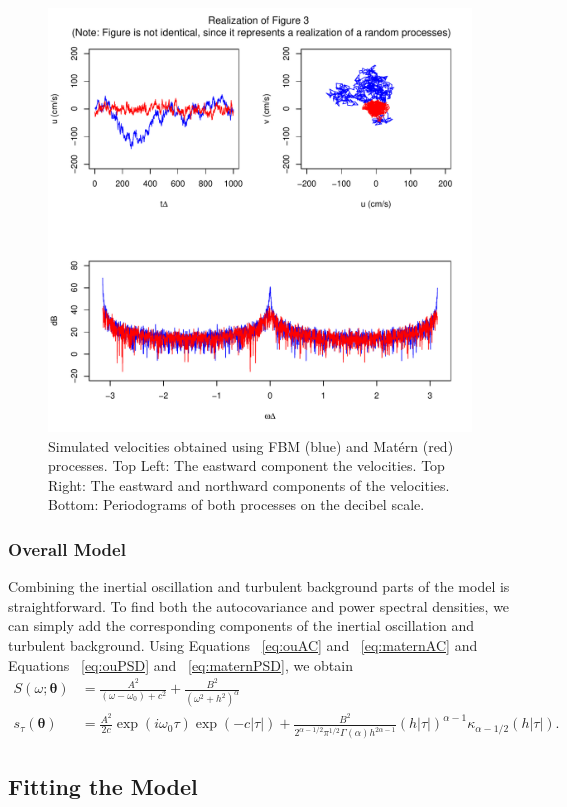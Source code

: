 \documentclass{stat572Style}
\begin{document}
\begin{figure}[hb]
	\label{fig: fmbMat}
  \centering
    \includegraphics[width=.5\textwidth]{fig3.pdf}
        \caption{Simulated velocities obtained using FBM (blue) and Mat\'{e}rn (red)  processes. Top Left: The eastward component the velocities. Top Right: The eastward and northward components of the velocities. Bottom: Periodograms of both processes on the decibel scale. }
\end{figure}

\subsubsection{Overall Model}
Combining the inertial oscillation and turbulent background parts of the model is straightforward. To find both the autocovariance and power spectral densities, we can simply add the corresponding components of the inertial oscillation and turbulent background. Using Equations ~\ref{eq:ouAC} and ~\ref{eq:maternAC} and Equations ~\ref{eq:ouPSD} and ~\ref{eq:maternPSD}, we obtain
\begin{align}
S(\omega; \boldsymbol{\theta}) &= \frac{A^{2}}{(\omega - \omega_{0}) + c^{2}} + \frac{B^{2}}{(\omega^{2} + h^{2})^{\alpha}}\\
\label{eq: fullSpec}
s_{\tau}(\boldsymbol{\theta}) &= \frac{A^{2}}{2c} \exp(i \omega_{0}\tau) \exp(-c|\tau|) +  \frac{B^{2}}{2^{\alpha - 1/2}\pi^{1/2} \Gamma(\alpha) h^{2 \alpha - 1}}(h|\tau|)^{\alpha - 1}\kappa_{\alpha - 1/2}(h|\tau|).
\end{align}

\subsection{Fitting the Model}
\end{document}
